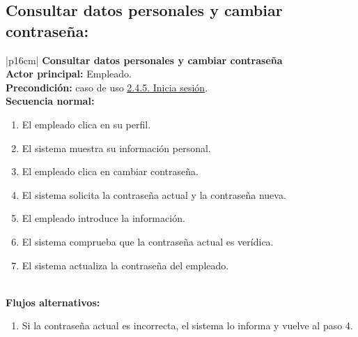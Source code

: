     \subsection{Consultar datos personales y cambiar contraseña:}
        \begin{longtable}{|p{16cm}|} 
        \hline
        \textbf{Consultar datos personales y cambiar contraseña} \\ \hline
        \textbf{Actor principal:} Empleado. \\ \hline
        \textbf{Precondición:} caso de uso \hyperref[subsec:2.4.5.]{2.4.5. Inicia sesión}. \\ \hline
        \textbf{Secuencia normal:} \\
        \begin{minipage}[t]{\linewidth}
            \begin{enumerate}
                \item El empleado clica en su perfil.
                \item El sistema muestra su información personal.
                \item El empleado clica en cambiar contraseña.
                \item El sistema solicita la contraseña actual y la contraseña nueva.
                \item El empleado introduce la información.
                \item El sistema comprueba que la contraseña actual es verídica.
                \item El sistema actualiza la contraseña del empleado.
            \end{enumerate}
            \vspace{1mm}
        \end{minipage} \\ \hline
        \textbf{Flujos alternativos:} \\
        \begin{minipage}[t]{\linewidth}
            \begin{enumerate}
                \item[6.a.] Si la contraseña actual es incorrecta, el sistema lo informa y vuelve al paso 4.
            \end{enumerate}
            \vspace{1mm}
        \end{minipage} \\ \hline
        \caption{Descripción general del caso de uso - Consultar datos personales y cambiar contraseña.}
        \end{longtable}

